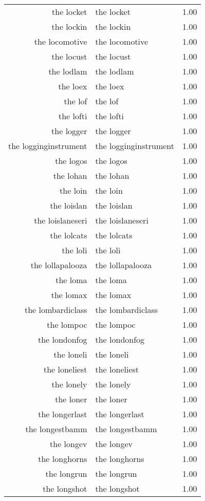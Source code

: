 \begin{table}[ht]
\begin{tabular}{rlr}
  the locket & the locket & 1.00 \\ 
  the lockin & the lockin & 1.00 \\ 
  the locomotive & the locomotive & 1.00 \\ 
  the locust & the locust & 1.00 \\ 
  the lodlam & the lodlam & 1.00 \\ 
  the loex & the loex & 1.00 \\ 
  the lof & the lof & 1.00 \\ 
  the lofti & the lofti & 1.00 \\ 
  the logger & the logger & 1.00 \\ 
  the logginginstrument & the logginginstrument & 1.00 \\ 
  the logos & the logos & 1.00 \\ 
  the lohan & the lohan & 1.00 \\ 
  the loin & the loin & 1.00 \\ 
  the loislan & the loislan & 1.00 \\ 
  the loislaneseri & the loislaneseri & 1.00 \\ 
  the lolcats & the lolcats & 1.00 \\ 
  the loli & the loli & 1.00 \\ 
  the lollapalooza & the lollapalooza & 1.00 \\ 
  the loma & the loma & 1.00 \\ 
  the lomax & the lomax & 1.00 \\ 
  the lombardiclass & the lombardiclass & 1.00 \\ 
  the lompoc & the lompoc & 1.00 \\ 
  the londonfog & the londonfog & 1.00 \\ 
  the loneli & the loneli & 1.00 \\ 
  the loneliest & the loneliest & 1.00 \\ 
  the lonely & the lonely & 1.00 \\ 
  the loner & the loner & 1.00 \\ 
  the longerlast & the longerlast & 1.00 \\ 
  the longestbamm & the longestbamm & 1.00 \\ 
  the longev & the longev & 1.00 \\ 
  the longhorns & the longhorns & 1.00 \\ 
  the longrun & the longrun & 1.00 \\ 
  the longshot & the longshot & 1.00 \\ 

\end{tabular}
\end{table}
